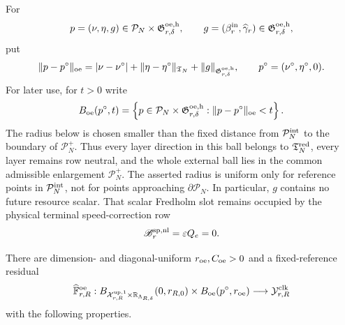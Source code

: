 \begin{theorem}
For
\begin{equation}
 p=(\nu,\eta,g)\in
       \mathcal P_N\times\mathfrak G_{r,\delta}^{\rm oe,h},
 \qquad
 g=(\beta_r^{\rm in},\widehat\gamma_r)
       \in\mathfrak G_{r,\delta}^{\rm oe,h},     \label{eq:oe-family-external-variable}
\end{equation}
put
\begin{equation}
 \|p-p^\circ\|_{\rm oe}
 =|\nu-\nu^\circ|
   +\|\eta-\eta^\circ\|_{\mathfrak T_N}
   +\|g\|_{\mathfrak G_{r,\delta}^{\rm oe,h}},
 \qquad p^\circ=(\nu^\circ,\eta^\circ,0).       \label{eq:oe-family-external-norm}
\end{equation}
For later use, for \(t>0\) write
\begin{equation}
 B_{\rm oe}(p^\circ,t)
 =\left\{p\in\mathcal P_N
       \times\mathfrak G_{r,\delta}^{\rm oe,h}:
       \|p-p^\circ\|_{\rm oe}<t\right\}.        \label{eq:oe-family-external-ball}
\end{equation}
The radius below is chosen smaller than the fixed distance from
\(\mathcal P_N^{\rm int}\) to the boundary of \(\mathcal P_N^+\).
Thus every layer direction
in this ball belongs to \(\mathfrak T_N^{\rm red}\), every layer remains
row neutral, and the whole external ball lies in the common admissible
enlargement \(\mathcal P_N^+\).  The asserted radius is uniform only for reference points
in \(\mathcal P_N^{\rm int}\), not for points approaching
\(\partial\mathcal P_N\).
In particular, \(g\) contains no future resource scalar.  That scalar
Fredholm slot remains occupied by the physical terminal speed-correction
row
\begin{equation}
 \mathscr B_r^{\rm sp,nl}=\varepsilon Q_e=0.     \label{eq:oe-family-speed-row}
\end{equation}

There are dimension- and diagonal-uniform \(r_{\rm oe},C_{\rm oe}>0\)
and a fixed-reference residual
\begin{equation}
 \widehat{\mathbb F}_{r,R}^{\rm oe}:
 B_{\mathcal X_{r,R}^{\rm up,1}
       \times\mathbb R_{\Lambda_{R,\delta}}}(0,r_{R,0})
 \times B_{\rm oe}(p^\circ,r_{\rm oe})
 \longrightarrow\mathcal Y_{r,R}^{\rm clk}       \label{eq:oe-family-residual-map}
\end{equation}
with the following properties.


\end{theorem}
